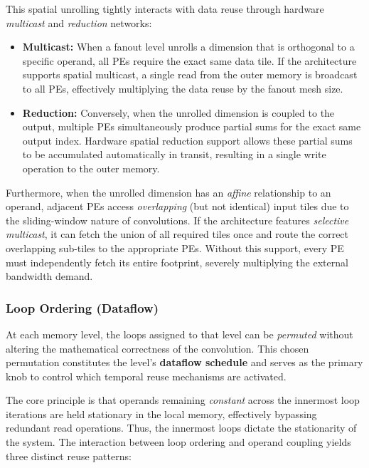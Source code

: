This spatial unrolling tightly interacts with data reuse through hardware \emph{multicast} and \emph{reduction} networks:
\begin{itemize}
  \item \textbf{Multicast:} When a fanout level unrolls a dimension that is orthogonal to a specific operand, all PEs require the exact same data tile. If the architecture supports spatial multicast, a single read from the outer memory is broadcast to all PEs, effectively multiplying the data reuse by the fanout mesh size.
  \item \textbf{Reduction:} Conversely, when the unrolled dimension is coupled to the output, multiple PEs simultaneously produce partial sums for the exact same output index. Hardware spatial reduction support allows these partial sums to be accumulated automatically in transit, resulting in a single write operation to the outer memory.
\end{itemize}

Furthermore, when the unrolled dimension has an \emph{affine} relationship to an operand, adjacent PEs access \emph{overlapping} (but not identical) input tiles due to the sliding-window nature of convolutions. If the architecture features \emph{selective multicast}, it can fetch the union of all required tiles once and route the correct overlapping sub-tiles to the appropriate PEs. Without this support, every PE must independently fetch its entire footprint, severely multiplying the external bandwidth demand.

\subsubsection{Loop Ordering (Dataflow)}
\label{sec:loop-ordering}

At each memory level, the loops assigned to that level can be \emph{permuted} without altering the mathematical correctness of the convolution. This chosen permutation constitutes the level's \textbf{dataflow schedule} and serves as the primary knob to control which temporal reuse mechanisms are activated. 

The core principle is that operands remaining \emph{constant} across the innermost loop iterations are held stationary in the local memory, effectively bypassing redundant read operations. Thus, the innermost loops dictate the stationarity of the system. The interaction between loop ordering and operand coupling yields three distinct reuse patterns:

